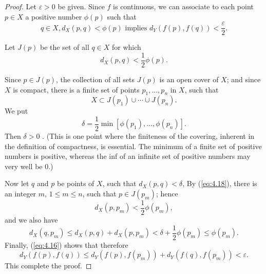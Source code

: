 \begin{proof}
    Let $\varepsilon > 0$ be given.
    Since $f$ is continuous, we can associate to each point $p \in X$ a positive number $\phi(p)$ such that 
    \begin{equation}
        \label{eq:4.16}
        q\in X, d_X(p, q) < \phi(p)
        \text{ implies }
        d_Y (f(p), f(q)) < \frac{\varepsilon}{2}.
    \end{equation}

    Let $J(p)$ be the set of all $q \in X$ for which
    \begin{equation}
        \label{eq:4.17}
        d_X(p, q) < \frac{1}{2}\phi(p).
    \end{equation}

    Since $p \in J(p)$, the collection of all sets $J(p)$ is an open cover of $X$;
    and since $X$ is compact, there is a finite set of points $p_1,...,p_n$ in $X$, such that 
    \begin{equation}
        \label{eq:4.18}
        X \subset J(p_1) \cup \cdots \cup J(p_n).
    \end{equation}
    We put 
    \begin{equation}
        \delta = \frac{1}{2} \min [\phi(p_1), ..., \phi(p_n)].
    \end{equation}
    Then $\delta > 0$ .
    (This is one point where the finiteness of the covering,
    inherent in the definition of compactness, is essential.
    The minimum of a finite set of positive numbers is positive,
    whereas the inf of an infinite set of positive numbers may very well be 0.)

    Now let $q$ and $p$ be points of $X$, such that $d_X(p, q) < \delta$,
    By (\ref{eq:4.18}), there is an integer $m$, $1 \leq m \leq n$, 
    such that $p \in J(p_m)$; hence 
    \begin{equation}
        \label{eq:4.20}
        d_X(p, p_m) < \frac{1}{2}\phi(p_m),
    \end{equation}
    and we also have 
    \begin{equation*}
        d_X(q, p_m) \leq
        d_X(p, q) +
        d_X(p, p_m) <
        \delta + \frac{1}{2}\phi(p_m) \leq
        \phi(p_m).
    \end{equation*}
    Finally, (\ref{eq:4.16}) shows that therefore 
    \begin{equation*}
        d_Y(f(p), f(q)) \leq
        d_Y(f(p), f(p_m)) +
        d_Y(f(q), f(p_m)) <
        \varepsilon .
    \end{equation*}
    This complete the proof.
\end{proof}

